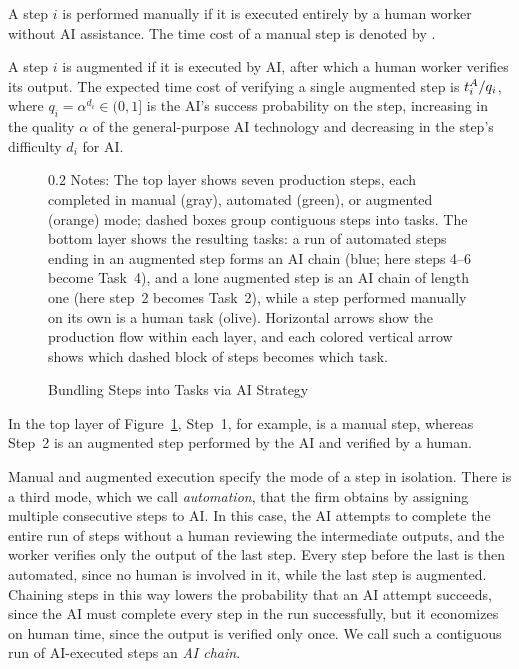 \begin{definition}
\label{def:manual_step}
A step $i$ is performed manually if it is executed entirely by a human worker without AI assistance.
The time cost of a manual step is denoted by .
\end{definition}

\begin{definition}
\label{def:augmented_step}
A step $i$ is augmented if it is executed by AI, after which a human worker verifies its output.
The expected time cost of verifying a single augmented step is $t^{A}_{i}/q_i$, where $q_i = \alpha^{d_i} \in (0,1]$ is the AI's success probability on the step, increasing in the quality $\alpha$ of the general-purpose AI technology and decreasing in the step's difficulty $d_i$ for AI.
\end{definition}

\begin{figure}[!t]
  \centering
  \caption{Bundling Steps into Tasks via AI Strategy}
  \label{fig:steps_tasks}
  
  \par\vspace{\fignotesskip}
\begin{minipage}{1\linewidth}
\begin{spacing}{0.2}
{\fontsize{9.5pt}{10pt}\selectfont Notes: The top layer shows seven production steps, each completed in manual (gray), automated (green), or augmented (orange) mode; dashed boxes group contiguous steps into tasks. The bottom layer shows the resulting tasks: a run of automated steps ending in an augmented step forms an AI chain (blue; here steps 4--6 become Task~4), and a lone augmented step is an AI chain of length one (here step~2 becomes Task~2), while a step performed manually on its own is a human task (olive). Horizontal arrows show the production flow within each layer, and each colored vertical arrow shows which dashed block of steps becomes which task.}
\end{spacing}
\end{minipage}
\end{figure}
In the top layer of Figure~\ref{fig:steps_tasks}, Step~1, for example, is a manual step, whereas Step~2 is an augmented step performed by the AI and verified by a human.

Manual and augmented execution specify the mode of a step in isolation.
There is a third mode, which we call \emph{automation}, that the firm obtains by assigning multiple consecutive steps to AI.
In this case, the AI attempts to complete the entire run of steps without a human reviewing the intermediate outputs, and the worker verifies only the output of the last step.
Every step before the last is then automated, since no human is involved in it, while the last step is augmented.
Chaining steps in this way lowers the probability that an AI attempt succeeds, since the AI must complete every step in the run successfully, but it economizes on human time, since the output is verified only once.
We call such a contiguous run of AI-executed steps an \emph{AI chain}.


